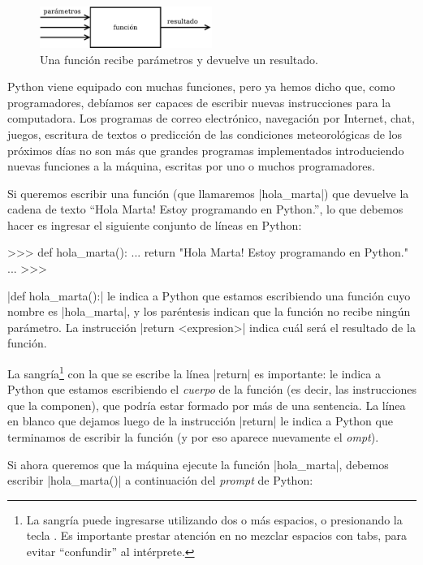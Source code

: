 \begin{figure}[ht]
\caption{Una función recibe parámetros y devuelve un resultado.}
\begin{center}
\includegraphics[width=0.5\textwidth]{graficos/funcion}
\end{center}
\end{figure}

Python viene equipado con muchas funciones, pero ya hemos dicho que, como
programadores, debíamos ser capaces de escribir nuevas instrucciones para la
computadora. Los programas de correo electrónico, navegación por Internet,
chat, juegos, escritura de textos o predicción de las condiciones
meteorológicas de los próximos días no son más que grandes programas
implementados introduciendo nuevas funciones a la máquina, escritas por uno o
muchos programadores.

Si queremos escribir una función (que llamaremos |hola_marta|) que devuelve la
cadena de texto ``Hola Marta! Estoy programando en Python.'', lo que debemos
hacer es ingresar el siguiente conjunto de líneas en Python:

\begin{codigo-python-sn}
>>> def hola_marta():
...     return "Hola Marta! Estoy programando en Python."
...
>>>
\end{codigo-python-sn}

|def hola_marta():| le indica a Python que estamos escribiendo una función cuyo
nombre es |hola_marta|, y los paréntesis indican que la función no recibe ningún
parámetro.  La instrucción |return <expresion>| indica cuál será el resultado
de la función.

La sangría\footnote{La sangría puede ingresarse utilizando dos o más espacios,
o presionando la tecla . Es importante prestar atención en no mezclar
espacios con tabs, para evitar ``confundir'' al intérprete.} con la que se
escribe la línea |return| es importante: le indica a Python que estamos
escribiendo el \emph{cuerpo} de la función (es decir, las instrucciones que la
componen), que podría estar formado por más de una sentencia.  La línea en
blanco que dejamos luego de la instrucción |return| le indica a Python que
terminamos de escribir la función (y por eso aparece nuevamente el 
\emph{ompt}).

Si ahora queremos que la máquina ejecute la función |hola_marta|, debemos
escribir |hola_marta()| a continuación del \emph{prompt} de Python:

